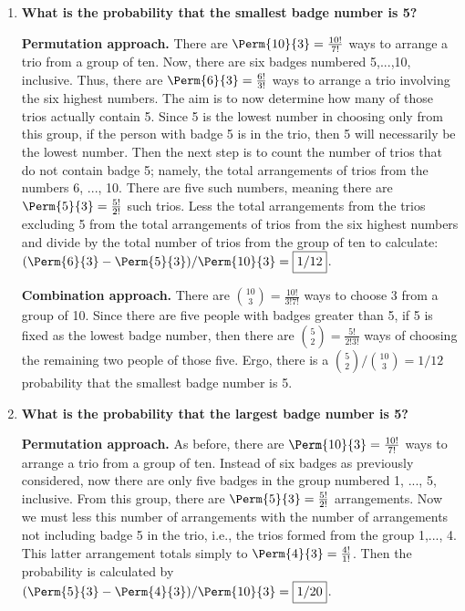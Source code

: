 \documentclass[10pt, oneside]{article}
\begin{document}
\begin{enumerate}[label=2.\arabic*]
	\begin{enumerate}
	\item  \begin{tcolorbox}[
  colback=Cerulean!5!white,
  colframe=Cerulean!75!black]
	\textbf{What is the probability that the smallest badge number is 5?}
	\end{tcolorbox}
	
	\textbf{Permutation approach.} There are $\Perm{10}{3} = \frac{10!}{7!}$ ways to arrange a trio from a group of ten. Now, there are six badges numbered 5,...,10, inclusive. Thus, there are $\Perm{6}{3} = \frac{6!}{3!}$ ways to arrange a trio involving the six highest numbers. The aim is to now determine how many of those trios actually contain 5. Since 5 is the lowest number in choosing only from this group, if the person with badge 5 is in the trio, then 5 will necessarily be the lowest number. Then the next step is to count the number of trios that do not contain badge 5; namely, the total arrangements of trios from the numbers 6, ..., 10. There are five such numbers, meaning there are $\Perm{5}{3} = \frac{5!}{2!}$ such trios. Less the total arrangements from the trios excluding 5 from the total arrangements of trios from the six highest numbers and divide by the total number of trios from the group of ten to calculate: $(\Perm{6}{3} - \Perm{5}{3}) / \Perm{10}{3} = \boxed{1/12}$.
	
	\textbf{Combination approach.} There are $\binom {10}{3} = \frac{10!}{3!7!}$ ways to choose 3 from a group of 10. Since there are five people with badges greater than 5, if 5 is fixed as the lowest badge number, then there are $\binom 52 = \frac{5!}{2! 3!}$ ways of choosing the remaining two people of those five. Ergo, there is a $\binom{5}{2} / \binom {10}{3} = \boxed{1/12}$ probability that the smallest badge number is 5.
	
	\item \begin{tcolorbox}[
  colback=Cerulean!5!white,
  colframe=Cerulean!75!black]
	\textbf{What is the probability that the largest badge number is 5?}
	\end{tcolorbox}
	
	\textbf{Permutation approach.} As before, there are $\Perm{10}{3} = \frac{10!}{7!}$ ways to arrange a trio from a group of ten. Instead of six badges as previously considered, now there are only five badges in the group numbered 1, ..., 5, inclusive. From this group, there are $\Perm{5}{3} = \frac{5!}{2!}$ arrangements. Now we must less this number of arrangements with the number of arrangements not including badge 5 in the trio, i.e., the trios formed from the group 1,..., 4. This latter arrangement totals simply to $\Perm{4}{3} = \frac{4!}{1!}$. Then the probability is calculated by $(\Perm{5}{3} - \Perm{4}{3}) / \Perm{10}{3} = \boxed{1/20}$. 
	

\end{enumerate}
\end{enumerate}
\end{document}
